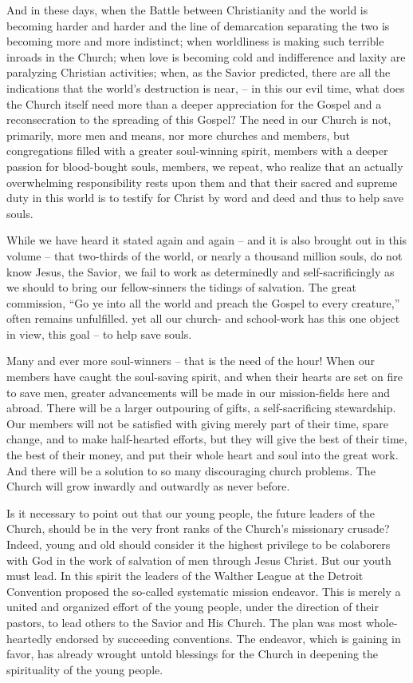 \documentclass[
]{book}
\begin{document}
And in these days, when the Battle between Christianity and the world is becoming harder and harder and the line of demarcation separating the two is becoming more and more indistinct; when worldliness is making such terrible inroads in the Church; when love is becoming cold and indifference and laxity are paralyzing Christian activities; when, as the Savior predicted, there are all the indications that the world's destruction is near, -- in this our evil time, what does the Church itself need more than a deeper appreciation for the Gospel and a reconsecration to the spreading of this Gospel? The need in our Church is not, primarily, more men and means, nor more churches and members, but congregations filled with a greater soul-winning spirit, members with a deeper passion for blood-bought souls, members, we repeat, who realize that an actually overwhelming responsibility rests upon them and that their sacred and supreme duty in this world is to testify for Christ by word and deed and thus to help save souls.

While we have heard it stated again and again -- and it is also brought out in this volume -- that two-thirds of the world, or nearly a thousand million souls, do not know Jesus, the Savior, we fail to work as determinedly and self-sacrificingly as we should to bring our fellow-sinners the tidings of salvation. The great commission, ``Go ye into all the world and preach the Gospel to every creature,'' often remains unfulfilled. yet all our church- and school-work has this one object in view, this goal -- to help save souls.

Many and ever more soul-winners -- that is the need of the hour! When our members have caught the soul-saving spirit, and when their hearts are set on fire to save men, greater advancements will be made in our mission-fields here and abroad. There will be a larger outpouring of gifts, a self-sacrificing stewardship. Our members will not be satisfied with giving merely part of their time, spare change, and to make half-hearted efforts, but they will give the best of their time, the best of their money, and put their whole heart and soul into the great work. And there will be a solution to so many discouraging church problems. The Church will grow inwardly and outwardly as never before.

Is it necessary to point out that our young people, the future leaders of the Church, should be in the very front ranks of the Church's missionary crusade? Indeed, young and old should consider it the highest privilege to be colaborers with God in the work of salvation of men through Jesus Christ. But our youth must lead. In this spirit the leaders of the Walther League at the Detroit Convention proposed the so-called systematic mission endeavor. This is merely a united and organized effort of the young people, under the direction of their pastors, to lead others to the Savior and His Church. The plan was most whole-heartedly endorsed by succeeding conventions. The endeavor, which is gaining in favor, has already wrought untold blessings for the Church in deepening the spirituality of the young people.
\end{document}
